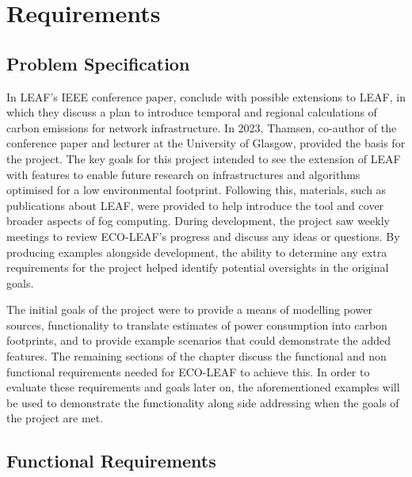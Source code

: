 \documentclass{l4proj}
\begin{document}
\chapter{Requirements}\label{ch:analysis/requirements}

\section{Problem Specification}
In LEAF's IEEE conference paper, \cite{leaf2021} conclude with possible extensions to LEAF, in which they discuss a plan to introduce temporal and regional calculations of carbon emissions for network infrastructure.
In 2023, Thamsen, co-author of the conference paper and lecturer at the University of Glasgow, provided the basis for the project.
The key goals for this project intended to see the extension of LEAF with features to enable future research on infrastructures and algorithms optimised for a low environmental footprint.
Following this, materials, such as publications about LEAF, were provided to help introduce the tool and cover broader aspects of fog computing.
During development, the project saw weekly meetings to review ECO-LEAF's progress and discuss any ideas or questions.
By producing examples alongside development, the ability to determine any extra requirements for the project helped identify potential oversights in the original goals.

The initial goals of the project were to provide a means of modelling power sources, functionality to translate estimates of power consumption into carbon footprints, and to provide example scenarios that could demonstrate the added features.
The remaining sections of the chapter discuss the functional and non functional requirements needed for ECO-LEAF to achieve this.
In order to evaluate these requirements and goals later on, the aforementioned examples will be used to demonstrate the functionality along side addressing when the goals of the project are met.
%
\section{Functional Requirements}
\end{document}
